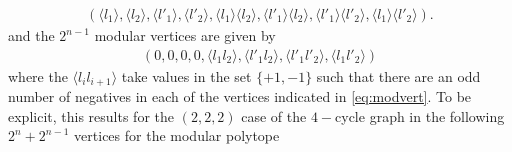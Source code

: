 \documentclass[10pt]{article}
\begin{document}
\begin{equation}
\begin{aligned}\label{eq:nonmodvert}
\left( \langle l_1 \rangle, \langle l_2 \rangle, \langle l'_1 \rangle, \langle l'_2 \rangle, \langle l_1 \rangle \langle l_2 \rangle, \langle l'_1 \rangle \langle l_2 \rangle, \langle l'_1 \rangle \langle l'_2 \rangle, \langle l_1 \rangle \langle l'_2 \rangle  \right).
\end{aligned}
\end{equation}
and the $2^{n-1}$ modular vertices are given by
\begin{equation}
\begin{aligned}\label{eq:modvert}
\left( 0, 0, 0, 0, \langle l_1 l_2 \rangle, \langle l'_1 l_2 \rangle, \langle l'_1 l'_2 \rangle, \langle l_1 l'_2 \rangle  \right)
\end{aligned}
\end{equation}
where the $\langle l_i l_{i+1} \rangle$ take values in the set $\{+1,-1\}$ such that there are an odd number of negatives in each of the vertices indicated in \ref{eq:modvert}. To be explicit, this results for the $(2,2,2)$ case of the $4-$cycle graph in the following $2^n + 2^{n-1}$ vertices for the modular polytope
\end{document}
